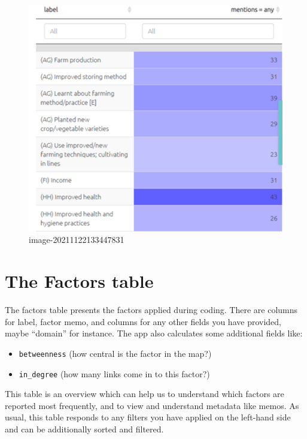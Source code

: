 \documentclass[
]{book}
\providecommand{\tightlist}{%
  \setlength{\itemsep}{0pt}\setlength{\parskip}{0pt}}
\begin{document}
\begin{figure}
\centering
\includegraphics[width=6.77083in,height=\textheight]{_assets/image-20211122133447831.png}
\caption{image-20211122133447831}
\end{figure}

\hypertarget{xthe-factors-table}{%
\chapter{The Factors table}\label{xthe-factors-table}}

The factors table presents the factors applied during coding. There are columns for label, factor memo, and columns for any other fields you have provided, maybe ``domain'' for instance. The app also calculates some additional fields like:

\begin{itemize}
\tightlist
\item
  \texttt{betweenness} (how central is the factor in the map?)
\item
  \texttt{in\_degree} (how many links come in to this factor?)
\end{itemize}

This table is an overview which can help us to understand which factors are reported most frequently, and to view and understand metadata like memos. As usual, this table responds to any filters you have applied on the left-hand side and can be additionally sorted and filtered.
\end{document}
